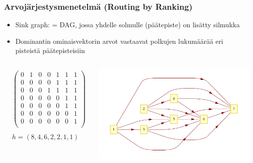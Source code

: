 \documentclass{beamer}
\begin{document}
\begin{frame}
  \frametitle{Arvojärjestysmenetelmä (Routing by Ranking)} 
  \begin{itemize}
   \item 
Sink graph: = DAG, jossa yhdelle solmulle (päätepiste) on lisätty silmukka
\item
Dominantin ominaisvektorin arvot vastaavat polkujen lukumäärää eri pisteistä päätepisteisiin
\end{itemize}
\begin{columns}
 \column{2.5in}
\begin{center}
{\scriptsize
\begin{align*}
& \left(
\begin{array}{ccccccc}
 0 & 1 & 0 & 0 & 1 & 1 & 1 \\
 0 & 0 & 0 & 0 & 1 & 1 & 1 \\
 0 & 0 & 0 & 1 & 1 & 1 & 1 \\
 0 & 0 & 0 & 0 & 0 & 1 & 1 \\
 0 & 0 & 0 & 0 & 0 & 1 & 1 \\
 0 & 0 & 0 & 0 & 0 & 0 & 1 \\
 0 & 0 & 0 & 0 & 0 & 0 & 1 \\
\end{array}
\right)\\
\\
& h = (8,4,6,2,2,1,1)
\end{align*} 
}
\end{center}

\column{2.5in}
\begin{center}
      \includegraphics[scale=0.5]{hub01}
      \end{center}
      \end{columns}

\end{frame}  
\end{document}
